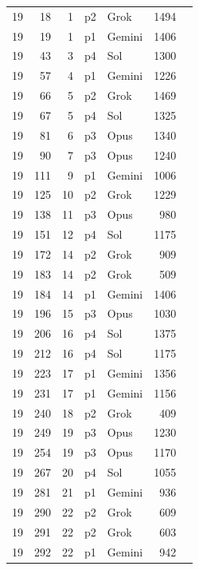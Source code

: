 \begin{longtable}{r r r l l r L{2.3in}}
19 & 18 & 1 & p2 & Grok & 1494 &  \\
19 & 19 & 1 & p1 & Gemini & 1406 &  \\
19 & 43 & 3 & p4 & Sol & 1300 &  \\
19 & 57 & 4 & p1 & Gemini & 1226 &  \\
19 & 66 & 5 & p2 & Grok & 1469 &  \\
19 & 67 & 5 & p4 & Sol & 1325 &  \\
19 & 81 & 6 & p3 & Opus & 1340 &  \\
19 & 90 & 7 & p3 & Opus & 1240 &  \\
19 & 111 & 9 & p1 & Gemini & 1006 &  \\
19 & 125 & 10 & p2 & Grok & 1229 &  \\
19 & 138 & 11 & p3 & Opus & 980 &  \\
19 & 151 & 12 & p4 & Sol & 1175 &  \\
19 & 172 & 14 & p2 & Grok & 909 &  \\
19 & 183 & 14 & p2 & Grok & 509 &  \\
19 & 184 & 14 & p1 & Gemini & 1406 &  \\
19 & 196 & 15 & p3 & Opus & 1030 &  \\
19 & 206 & 16 & p4 & Sol & 1375 &  \\
19 & 212 & 16 & p4 & Sol & 1175 &  \\
19 & 223 & 17 & p1 & Gemini & 1356 &  \\
19 & 231 & 17 & p1 & Gemini & 1156 &  \\
19 & 240 & 18 & p2 & Grok & 409 &  \\
19 & 249 & 19 & p3 & Opus & 1230 &  \\
19 & 254 & 19 & p3 & Opus & 1170 &  \\
19 & 267 & 20 & p4 & Sol & 1055 &  \\
19 & 281 & 21 & p1 & Gemini & 936 &  \\
19 & 290 & 22 & p2 & Grok & 609 &  \\
19 & 291 & 22 & p2 & Grok & 603 &  \\
19 & 292 & 22 & p1 & Gemini & 942 &  \\

\end{longtable}
